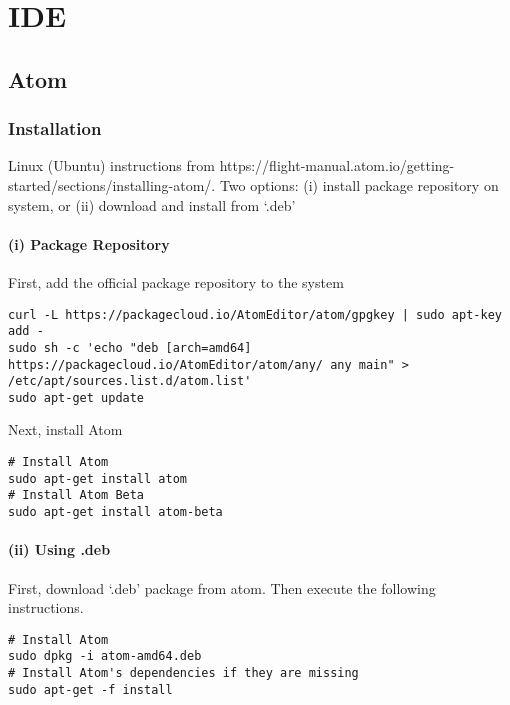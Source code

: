 \section{IDE}

\subsection{Atom}


\subsubsection{Installation}

Linux (Ubuntu) instructions from https://flight-manual.atom.io/getting-started/sections/installing-atom/. Two options: (i) install package repository on system, or (ii) download and install from `.deb'

\paragraph{(i) Package Repository}

First, add the official package repository to the system
\begin{lstlisting}[style=terminalBash]
curl -L https://packagecloud.io/AtomEditor/atom/gpgkey | sudo apt-key add -
sudo sh -c 'echo "deb [arch=amd64] https://packagecloud.io/AtomEditor/atom/any/ any main" > /etc/apt/sources.list.d/atom.list'
sudo apt-get update
\end{lstlisting}

Next, install Atom
\begin{lstlisting}[style=terminalBash]
# Install Atom
sudo apt-get install atom
# Install Atom Beta
sudo apt-get install atom-beta
\end{lstlisting}

\paragraph{(ii) Using .deb}

First, download `.deb' package from atom. Then execute the following instructions.
\begin{lstlisting}[style=terminalBash]
# Install Atom
sudo dpkg -i atom-amd64.deb
# Install Atom's dependencies if they are missing
sudo apt-get -f install
\end{lstlisting}